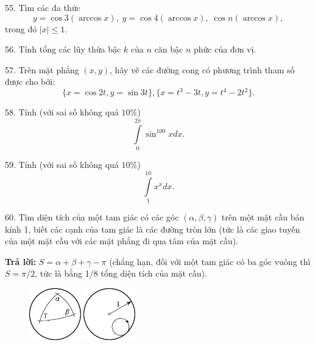 \begin{problem}{55.}
	Tìm các đa thức 
	$$y=\cos 3(\arccos x), \;y=\cos 4(\arccos x), \; \cos n(\arccos x),$$
	trong đó $|x|\leq 1$.
\end{problem}

\begin{problem}{56.}
	Tính tổng các lũy thừa bậc $k$ của $n$ căn bậc $n$ phức của đơn vị. 
\end{problem}

\begin{problem}{57.}
	Trên mặt phẳng $(x,y)$, hãy vẽ các đường cong có phương trình tham số được cho bởi:
	$$\{x=\cos 2t, y=\sin 3t\}, \{x=t^3-3t, y=t^4-2t^2\}.$$
\end{problem}

\begin{problem}{58.}
	Tính (với sai số không quá $10 \%$)
	$$\int\limits_{0}^{2\pi}\sin^{100}xdx.$$
\end{problem}

\begin{problem}{59.}
	Tính (với sai số không quá $10 \%$)
	$$\int\limits_{1}^{10}x^xdx.$$
\end{problem}

\begin{problem}{60.}
	Tìm diện tích của một tam giác có các góc $(\alpha, \beta, \gamma)$ trên một mặt cầu bán kính 1, biết các cạnh của tam giác là các đường tròn lớn  (tức là các giao tuyến của một mặt cầu với các mặt phẳng đi qua tâm của mặt cầu).

	\textbf{Trả lời:} $S=\alpha+\beta+\gamma -\pi$ (chẳng hạn, đối với một tam giác có ba góc vuông thì $S=\pi/2$, tức là  bằng 1/8 tổng diện tích của mặt cầu).
	\begin{figure}
		\includegraphics[width=0.2\textwidth]{taskbook-44} \qquad \includegraphics[width=0.2\textwidth]{taskbook-45} 
	\end{figure}
\end{problem}

